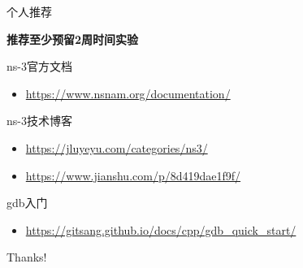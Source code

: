 \documentclass{beamer}
\begin{document}
\begin{frame}{个人推荐}
	
	
	\textbf{推荐至少预留2周时间实验}

	ns-3官方文档
	\begin{itemize}
		\item \href{https://www.nsnam.org/documentation/}{https://www.nsnam.org/documentation/}
	\end{itemize}
	ns-3技术博客
	\begin{itemize}
		\item \href{https://jluyeyu.com/categories/ns3/}{https://jluyeyu.com/categories/ns3/}
		\item \href{https://www.jianshu.com/p/8d419dae1f9f}{https://www.jianshu.com/p/8d419dae1f9f/}
	\end{itemize}
	gdb入门
	\begin{itemize}
		\item \href{https://gitsang.github.io/docs/cpp/gdb\_quick\_start}{https://gitsang.github.io/docs/cpp/gdb\_quick\_start/}
	\end{itemize}

\end{frame}

\begin{frame}
	\begin{center}
		{\Huge\calligra Thanks!}
	\end{center}
\end{frame}
\end{document}
